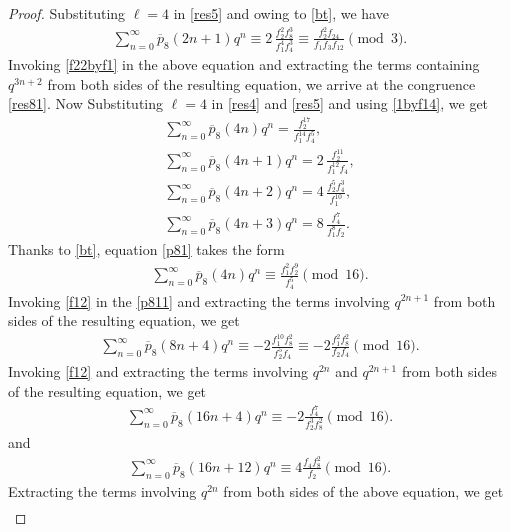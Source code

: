 \documentclass[11pt, reqno]{amsart}
\numberwithin{equation}{section}
\begin{document}
	\begin{proof}
		Substituting $\ell=4$ in \eqref{res5} and owing to \eqref{bt}, we have
		\begin{align}
			\sum_{n=0}^{\infty}\overline{p}_{8}(2n+1)q^n\equiv2\,\frac{f_2^2f_8^3}
			{f_1^4f_4^3}\equiv\frac{f_2^2f_{24}}
			{f_1f_3f_{12}}\pmod{3}.
		\end{align}
		Invoking \eqref{f22byf1} in the above equation and extracting the terms containing $q^{3n+2}$ from both sides of the resulting equation, we arrive at the congruence \eqref{res81}.
		Now Substituting $\ell=4$ in \eqref{res4} and \eqref{res5} and using \eqref{1byf14}, we get 
		\begin{align}
			\sum_{n=0}^{\infty}\overline{p}_{8}(4n)q^n=\frac{f_2^{17}}{f_1^{14}f_4^5},\label{p81}\\
			\sum_{n=0}^{\infty}\overline{p}_{8}(4n+1)q^n=2\,\frac{f_2^{11}}{f_1^{12}f_4},\label{p4321}\\
			\sum_{n=0}^{\infty}\overline{p}_{8}(4n+2)q^n=4\,\frac{f_2^5f_4^3}{f_1^{10}},\label{p82}\\
			\sum_{n=0}^{\infty}\overline{p}_{8}(4n+3)q^n=8\,\frac{f_4^7}{f_1^8f_2}.\label{p4322}
		\end{align}
		Thanks to \eqref{bt}, equation \eqref{p81} takes the form
		\begin{align}
			\sum_{n=0}^{\infty}\overline{p}_{8}(4n)q^n\equiv\frac{f_1^2f_2^{9}}{f_4^5}\pmod{16}.\label{p811}
		\end{align}
		Invoking \eqref{f12} in the \eqref{p811} and extracting the terms involving $q^{2n+1}$ from both sides of the resulting equation, we get 
		\begin{align}
			\sum_{n=0}^{\infty}\overline{p}_{8}(8n+4)q^n\equiv-2\frac{f_1^{10}f_8^{2}}{f_2^5f_4}\equiv-2\frac{f_1^{2}f_8^{2}}{f_2f_4}\pmod{16}.\label{p812}
		\end{align}
		Invoking \eqref{f12} and extracting the terms involving $q^{2n}$  and $q^{2n+1}$ from both sides of the resulting equation, we get
		\begin{align}
			\sum_{n=0}^{\infty}\overline{p}_{8}(16n+4)q^n\equiv-2\frac{f_4^7}{f_2^3f_8^2}\pmod{16}.\label{p8131}
		\end{align} 
		and
		\begin{align}
			\sum_{n=0}^{\infty}\overline{p}_{8}(16n+12)q^n\equiv4\frac{f_4f_8^{2}}{f_2}\pmod{16}.\label{p813}
		\end{align}    
		Extracting the terms involving $q^{2n}$ from both sides of the above equation, we get
		\begin{align}

\end{align}
\end{proof}
\end{document}
